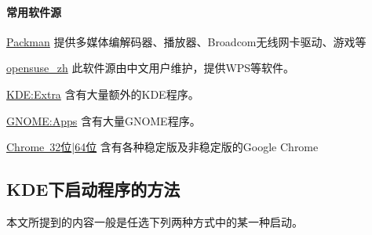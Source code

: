 \documentclass[11pt,openany]{book}
\begin{document}
\paragraph{常用软件源}\label{repo}

\begin{compactdesc}
 \item[\href{http://mirrors.hust.edu.cn/packman/suse/openSUSE_13.2/}{Packman}]
 提供多媒体编解码器、播放器、Broadcom无线网卡驱动、游戏等
 \item[\href{http://download.opensuse.org/repositories/home:/opensuse_zh/openSUSE_13.2/}{opensuse\_zh}]
 此软件源由中文用户维护，提供WPS等软件。
 \item[\href{http://download.opensuse.org/repositories/KDE:/Extra/openSUSE_13.2/}{KDE:Extra}]
 含有大量额外的KDE程序。
 \item[\href{http://download.opensuse.org/repositories/GNOME:/Apps/openSUSE_13.2/}{GNOME:Apps}]
 含有大量GNOME程序。
 \item[\href{http://dl.google.com/linux/chrome/rpm/stable/i386}{Chrome~32位}|\href{http://dl.google.com/linux/chrome/rpm/stable/x86_64}{64位}] 含有各种稳定版及非稳定版的Google Chrome
\end{compactdesc}
\subsection{KDE下启动程序的方法}
本文所提到的内容一般是任选下列两种方式中的某一种启动。
\end{document}
